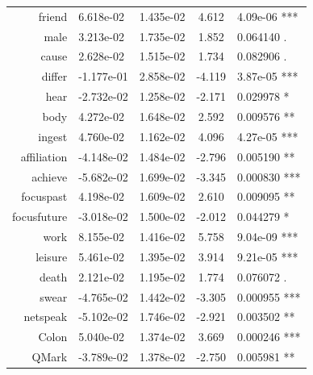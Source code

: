 \documentclass[bsc,frontabs,twoside,singlespacing,parskip,deptreport]{infthesis}
\begin{document}
\begin{table}[p]
{\begin{tabular}{rlccl}
friend      & 6.618e-02                    & 1.435e-02  & 4.612   & 4.09e-06 ***                        \\
male        & 3.213e-02                    & 1.735e-02  & 1.852   & 0.064140 .                          \\
cause       & 2.628e-02                    & 1.515e-02  & 1.734   & 0.082906 .                          \\
differ      & -1.177e-01                   & 2.858e-02  & -4.119  & 3.87e-05 ***                        \\
hear        & -2.732e-02                   & 1.258e-02  & -2.171  & 0.029978 *                          \\
body        & 4.272e-02                    & 1.648e-02  & 2.592   & 0.009576 **                         \\
ingest      & 4.760e-02                    & 1.162e-02  & 4.096   & 4.27e-05 ***                        \\
affiliation & -4.148e-02                   & 1.484e-02  & -2.796  & 0.005190 **                         \\
achieve     & -5.682e-02                   & 1.699e-02  & -3.345  & 0.000830 ***                        \\
focuspast   & 4.198e-02                    & 1.609e-02  & 2.610   & 0.009095 **                         \\
focusfuture & -3.018e-02                   & 1.500e-02  & -2.012  & 0.044279 *                          \\
work        & 8.155e-02                    & 1.416e-02  & 5.758   & 9.04e-09 ***                        \\
leisure     & 5.461e-02                    & 1.395e-02  & 3.914   & 9.21e-05 ***                        \\
death       & 2.121e-02                    & 1.195e-02  & 1.774   & 0.076072 .                          \\
swear       & -4.765e-02                   & 1.442e-02  & -3.305  & 0.000955 ***                        \\
netspeak    & -5.102e-02                   & 1.746e-02  & -2.921  & 0.003502 **                         \\
Colon       & 5.040e-02                    & 1.374e-02  & 3.669   & 0.000246 ***                        \\
QMark       & -3.789e-02                   & 1.378e-02  & -2.750  & 0.005981 **                         \\

\end{tabular}}
\end{table}
\end{document}
